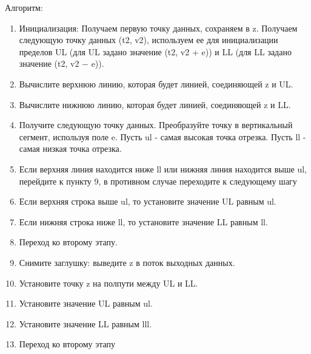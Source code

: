 Алгоритм: 
\begin{enumerate}
    \item Инициализация: Получаем первую точку данных, сохраняем в z. Получаем следующую точку данных (t2, v2), используем ее для инициализации пределов UL (для UL задано значение (t2, v2 + e)) и LL (для LL задано значение (t2, v2 − e)).
    \item Вычислите верхнюю линию, которая будет линией, соединяющей z и UL.
    \item Вычислите нижнюю линию, которая будет линией, соединяющей z и LL.
    \item Получите следующую точку данных. Преобразуйте точку в вертикальный сегмент, используя поле e. Пусть ul - самая высокая точка отрезка. Пусть ll - самая низкая точка отрезка.
    \item Если верхняя линия находится ниже ll или нижняя линия находится выше ul, перейдите к пункту 9, в противном случае переходите к следующему шагу
    \item Если верхняя строка выше ul, то установите значение UL равным ul.
    \item Если нижняя строка ниже ll, то установите значение LL равным ll.
    \item Переход ко второму этапу.
    \item Снимите заглушку: выведите z в поток выходных данных.
    \item Установите точку z на полпути между UL и LL.
    \item Установите значение UL равным ul.
    \item Установите значение LL равным lll.
    \item Переход ко второму этапу
\end{enumerate}


\endinput
